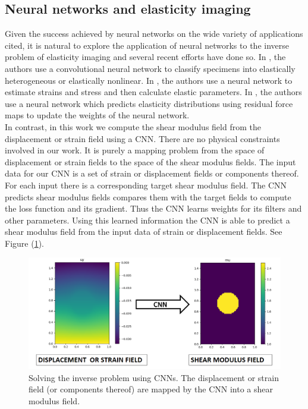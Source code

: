 \documentclass[12pt]{article}
\begin{document}
\subsection{Neural networks and elasticity imaging}
Given the success achieved by neural networks on the wide variety of applications cited, it is natural to explore the application of neural networks to the inverse problem of elasticity imaging and several recent efforts \cite{paper:pateloberai2019,misc:gu2020,paper:hoeriginsana2016} have done so. In \cite{paper:pateloberai2019}, the authors use a convolutional neural network to classify specimens into elastically heterogeneous or elastically nonlinear. In \cite{paper:hoeriginsana2016}, the authors use a neural network to estimate strains and stress and then calculate elastic parameters. In \cite{misc:gu2020}, the authors use a neural network which predicts elasticity distributions using residual force maps to update the weights of the neural network. \\In contrast, in this work we compute the shear modulus field from the displacement or strain field using a CNN. There are no physical constraints involved in our work. It is purely a mapping problem from the space of displacement or strain fields to the space of the shear modulus fields. The input data for our CNN is a set of strain or displacement fields or components thereof. For each input there is a corresponding target shear modulus field. The CNN predicts shear modulus fields compares them with the target fields to compute the loss function and its gradient. Thus the CNN learns weights for its filters and other parameters. Using this learned information the CNN is able to predict a shear modulus field from the input data of strain or displacement fields. See Figure (\ref{fig:schematic_inv}).
%
\begin{figure}
   \centering
    \includegraphics[totalheight=5cm]{Figures/schematic_inv/schematic_inv.png}
  \caption{\label{fig:schematic_inv} Solving the inverse problem using CNNs. The displacement or strain field (or components thereof) are mapped by the CNN into a shear modulus field.}
\end{figure}
%
\end{document}
